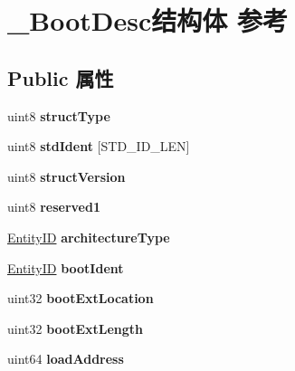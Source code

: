 \hypertarget{struct___boot_desc}{}\section{\+\_\+\+Boot\+Desc结构体 参考}
\label{struct___boot_desc}
\subsection*{Public 属性}
\begin{DoxyCompactItemize}
\item 
\mbox{\label{struct___boot_desc_a52caae06f993dbd7b12e24d8524404aa}} 
uint8 {\bfseries struct\+Type}
\item 
\mbox{\label{struct___boot_desc_a48abebcbd0520c8d6d27d949b8993c44}} 
uint8 {\bfseries std\+Ident} \mbox{[}S\+T\+D\+\_\+\+I\+D\+\_\+\+L\+EN\mbox{]}
\item 
\mbox{\label{struct___boot_desc_aa6518327ab13c5fa4afbea43f04415c6}} 
uint8 {\bfseries struct\+Version}
\item 
\mbox{\label{struct___boot_desc_a9a8fd189ff1495fc140d5ec30e275b3b}} 
uint8 {\bfseries reserved1}
\item 
\mbox{\label{struct___boot_desc_a930f4017984c1a6559a87695f9665ae2}} 
\hyperlink{struct_entity_i_d}{Entity\+ID} {\bfseries architecture\+Type}
\item 
\mbox{\label{struct___boot_desc_a06e53c23eef6fe83a0e0b7743423f996}} 
\hyperlink{struct_entity_i_d}{Entity\+ID} {\bfseries boot\+Ident}
\item 
\mbox{\label{struct___boot_desc_adef930ecb5a5d673f503ba297ce14379}} 
uint32 {\bfseries boot\+Ext\+Location}
\item 
\mbox{\label{struct___boot_desc_ac48fe72625cb80d03368c8f07aa8411a}} 
uint32 {\bfseries boot\+Ext\+Length}
\item 
\mbox{\label{struct___boot_desc_a8ad6a4d3256ebe85f2ec5d7d74ddb049}} 
uint64 {\bfseries load\+Address}

\end{DoxyCompactItemize}
